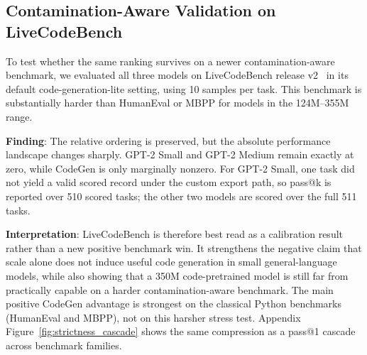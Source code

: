 \documentclass[preprint,12pt,authoryear]{elsarticle}
\begin{document}
\subsection{Contamination-Aware Validation on LiveCodeBench}

To test whether the same ranking survives on a newer contamination-aware benchmark, we evaluated all three models on LiveCodeBench release v2~\cite{jain2024livecodebench} in its default code-generation-lite setting, using 10 samples per task. This benchmark is substantially harder than HumanEval or MBPP for models in the 124M--355M range.

\begin{table}[t]
\centering
\caption{LiveCodeBench release v2 Validation}
\label{tab:livecodebench_validation}
\scriptsize
{}
\end{table}

\textbf{Finding}: The relative ordering is preserved, but the absolute performance landscape changes sharply. GPT-2 Small and GPT-2 Medium remain exactly at zero, while CodeGen is only marginally nonzero. For GPT-2 Small, one task did not yield a valid scored record under the custom export path, so pass@k is reported over 510 scored tasks; the other two models are scored over the full 511 tasks.

\textbf{Interpretation}: LiveCodeBench is therefore best read as a calibration result rather than a new positive benchmark win. It strengthens the negative claim that scale alone does not induce useful code generation in small general-language models, while also showing that a 350M code-pretrained model is still far from practically capable on a harder contamination-aware benchmark. The main positive CodeGen advantage is strongest on the classical Python benchmarks (HumanEval and MBPP), not on this harsher stress test. Appendix Figure~\ref{fig:strictness_cascade} shows the same compression as a pass@1 cascade across benchmark families.
\end{document}
